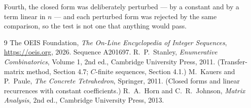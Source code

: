 \documentclass[11pt,a4paper]{article}
\theoremstyle{plain}
\theoremstyle{definition}
\begin{document}
Fourth, the closed form was deliberately perturbed --- by a constant and by a term linear in
$n$ --- and each perturbed form was rejected by the same comparison, so the test is not one
that anything would pass.

\begin{thebibliography}{9}
 The OEIS Foundation, \emph{The On-Line Encyclopedia of Integer
Sequences}, \url{https://oeis.org}, 2026. Sequence A201697.
 R.~P.~Stanley, \emph{Enumerative Combinatorics}, Volume 1, 2nd ed.,
Cambridge University Press, 2011. (Transfer-matrix method, Section 4.7; $C$-finite sequences,
Section 4.1.)
 M.~Kauers and P.~Paule, \emph{The Concrete Tetrahedron}, Springer, 2011.
(Closed forms and linear recurrences with constant coefficients.)
 R.~A.~Horn and C.~R.~Johnson, \emph{Matrix Analysis}, 2nd ed., Cambridge
University Press, 2013.
\end{thebibliography}
\end{document}

